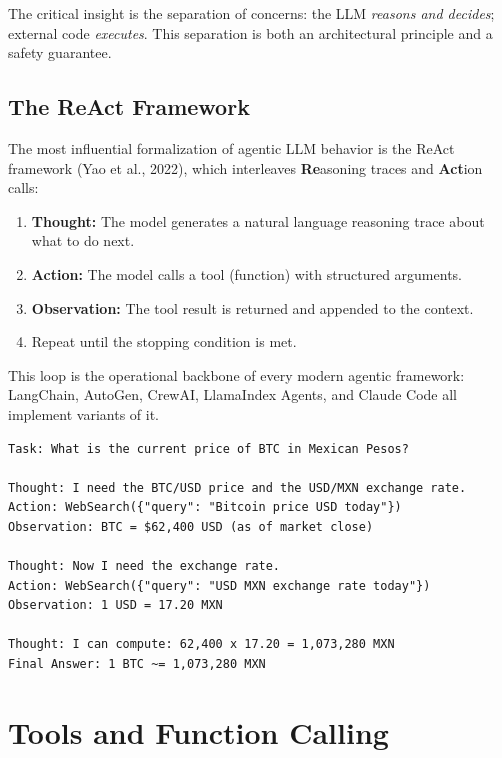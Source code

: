 \documentclass[11pt,letterpaper]{article}
\begin{document}
The critical insight is the separation of concerns: the LLM \emph{reasons and decides}; external code \emph{executes}. This separation is both an architectural principle and a safety guarantee.

\subsection{The ReAct Framework}

The most influential formalization of agentic LLM behavior is the ReAct framework (Yao et al., 2022), which interleaves \textbf{Re}asoning traces and \textbf{Act}ion calls:

\begin{enumerate}[leftmargin=*]
    \item \textbf{Thought:} The model generates a natural language reasoning trace about what to do next.
    \item \textbf{Action:} The model calls a tool (function) with structured arguments.
    \item \textbf{Observation:} The tool result is returned and appended to the context.
    \item Repeat until the stopping condition is met.
\end{enumerate}

This loop is the operational backbone of every modern agentic framework: LangChain, AutoGen, CrewAI, LlamaIndex Agents, and Claude Code all implement variants of it.

\begin{examplebox}[title=ReAct Trace Example]
\begin{verbatim}
Task: What is the current price of BTC in Mexican Pesos?

Thought: I need the BTC/USD price and the USD/MXN exchange rate.
Action: WebSearch({"query": "Bitcoin price USD today"})
Observation: BTC = $62,400 USD (as of market close)

Thought: Now I need the exchange rate.
Action: WebSearch({"query": "USD MXN exchange rate today"})
Observation: 1 USD = 17.20 MXN

Thought: I can compute: 62,400 x 17.20 = 1,073,280 MXN
Final Answer: 1 BTC ~= 1,073,280 MXN
\end{verbatim}
\end{examplebox}

\section{Tools and Function Calling}
\end{document}
